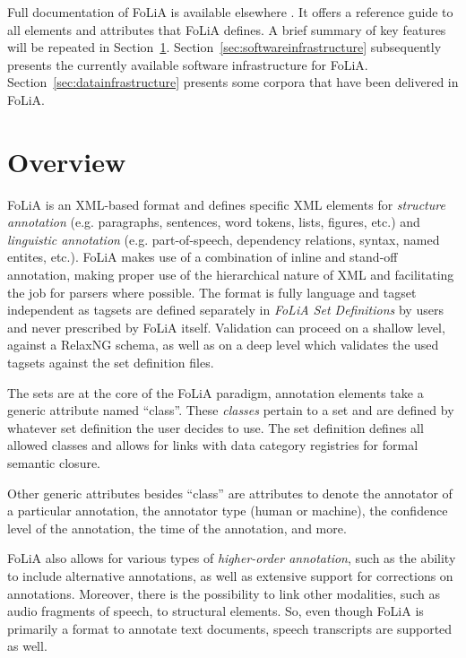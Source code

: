 \documentclass[a4paper,11pt]{article}
\begin{document}
Full documentation of FoLiA is available elsewhere \cite{FOLIADOC2014}. It
offers a reference guide to all elements and attributes that FoLiA defines.  A
brief summary of key features will be repeated in Section~\ref{sec:overview}.
Section~\ref{sec:softwareinfrastructure} subsequently presents the currently
available software infrastructure for FoLiA.
Section~\ref{sec:datainfrastructure} presents some corpora that have been
delivered in FoLiA.

\section{Overview}
\label{sec:overview}

FoLiA is an XML-based format and defines specific XML elements for \emph{structure
annotation} (e.g. paragraphs, sentences, word tokens, lists, figures, etc.) and
\emph{linguistic annotation} (e.g. part-of-speech, dependency relations,
syntax, named entites, etc.). FoLiA makes use of a combination of inline and
stand-off annotation, making proper use of the hierarchical nature of XML and
facilitating the job for parsers where possible. The format is fully language and
tagset independent as tagsets are defined separately in \emph{FoLiA Set Definitions}
by users and never prescribed by FoLiA itself. Validation can proceed
on a shallow level, against a RelaxNG schema, as well as on a deep level which
validates the used tagsets against the set definition files.

The sets are at the core of the FoLiA paradigm, annotation elements take a
generic attribute named ``class''. These \emph{classes} pertain to a set and are
defined by whatever set definition the user decides to use. The set definition
defines all allowed classes and allows for links with data category registries
for formal semantic closure.

Other generic attributes besides ``class'' are attributes to denote the
annotator of a particular annotation, the annotator type (human or machine),
the confidence level of the annotation, the time of the annotation, and more.

FoLiA also allows for various types of \emph{higher-order annotation}, such as
the ability to include alternative annotations, as well as extensive support
for corrections on annotations. Moreover, there is the possibility to link other
modalities, such as audio fragments of speech, to structural elements. So, even
though FoLiA is primarily a format to annotate text documents, speech
transcripts are supported as well. 
\end{document}
